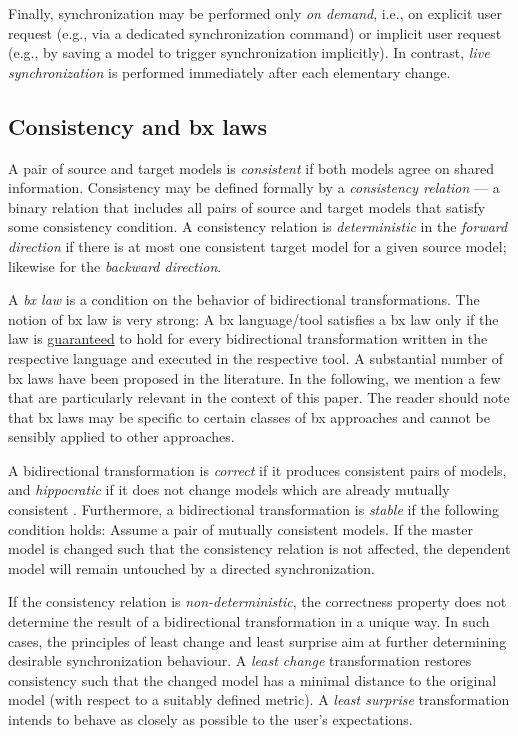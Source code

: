 Finally, synchronization may be performed only \emph{on demand}, i.e., on explicit user request (e.g., via a dedicated synchronization command) or implicit user request (e.g., by saving a model to trigger synchronization implicitly).
In contrast, \emph{live synchronization} is performed immediately after each elementary change.  

\subsection{Consistency and bx laws}
\label{sec:Consistency}

A pair of source and target models is \emph{consistent} if both models agree on shared information. Consistency may be defined formally by a \emph{consistency relation} --- a binary relation that includes all pairs of source and target models that satisfy some consistency condition. A consistency relation is \emph{deterministic} in the \emph{forward direction} if there is at most one consistent target model for a given source model; likewise for the \emph{backward direction}. 

A \emph{bx law} is a condition on the behavior of bidirectional transformations. The notion of bx law is very strong: A bx language/tool satisfies a bx law only if the law is \underline{guaranteed} to hold for every bidirectional transformation written in the respective language and executed in the respective tool. A substantial number of bx laws have been proposed in the literature. 
In the following, we mention a few that are particularly relevant in the context of this paper. The reader should note that bx laws may be specific to certain classes of bx approaches and cannot be sensibly applied to other approaches.

A bidirectional transformation is \emph{correct} if it produces consistent pairs of models, and \emph{hippocratic} if it does not change models which are already mutually consistent \cite{SOSYM-Stevens2010}. Furthermore, a bidirectional transformation is \emph{stable} \cite{DBLP:journals/corr/PachecoMCV13} if the following condition holds: Assume a pair of mutually consistent models. If the master model is changed such that the consistency relation is not affected, the dependent model will remain untouched by a directed synchronization.
 
If the consistency relation is \emph{non-deter\-min\-is\-tic}, the correctness property does not determine the result of a bidirectional transformation in a unique way. 
In such cases, the principles of least change and least surprise aim at further determining desirable synchronization behaviour. 
A \emph{least change} transformation \cite{SOSYM-Macedo2016} restores consistency such that the changed model has a minimal distance to the original model (with respect to a suitably defined metric). 
A \emph{least surprise} transformation \cite{Cheney2015} intends to behave as closely as possible to the user's expectations.

